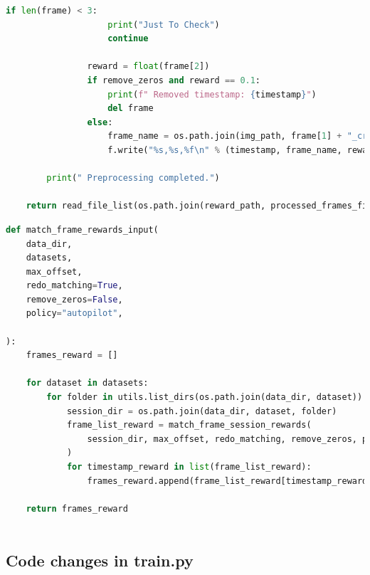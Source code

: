 \documentclass[12pt]{report}
\begin{document}
\begin{lstlisting}[language=Python]
                if len(frame) < 3:
                    print("Just To Check")
                    continue

                reward = float(frame[2])
                if remove_zeros and reward == 0.1:
                    print(f" Removed timestamp: {timestamp}")
                    del frame
                else:
                    frame_name = os.path.join(img_path, frame[1] + "_crop.jpeg")
                    f.write("%s,%s,%f\n" % (timestamp, frame_name, reward))

        print(" Preprocessing completed.")

    return read_file_list(os.path.join(reward_path, processed_frames_file_name))
\end{lstlisting}

\begin{lstlisting}[language=Python]
def match_frame_rewards_input(
    data_dir,
    datasets,
    max_offset,
    redo_matching=True,
    remove_zeros=False,
    policy="autopilot",
    
):
    frames_reward = []

    for dataset in datasets:
        for folder in utils.list_dirs(os.path.join(data_dir, dataset)):
            session_dir = os.path.join(data_dir, dataset, folder)
            frame_list_reward = match_frame_session_rewards( 
                session_dir, max_offset, redo_matching, remove_zeros, policy
            )
            for timestamp_reward in list(frame_list_reward):
                frames_reward.append(frame_list_reward[timestamp_reward][0])

    return frames_reward
    
\end{lstlisting}

\subsection*{Code changes in train.py}
\label{sub:train}
\end{document}
